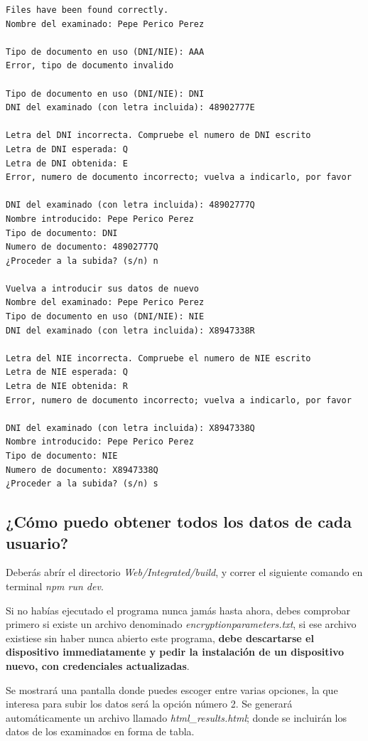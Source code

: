 \documentclass[12pt,a4paper,twoside,openright]{book}
\begin{document}
\begin{umaappendices}
\begin{verbatim}
Files have been found correctly.
Nombre del examinado: Pepe Perico Perez

Tipo de documento en uso (DNI/NIE): AAA
Error, tipo de documento invalido

Tipo de documento en uso (DNI/NIE): DNI
DNI del examinado (con letra incluida): 48902777E

Letra del DNI incorrecta. Compruebe el numero de DNI escrito
Letra de DNI esperada: Q
Letra de DNI obtenida: E
Error, numero de documento incorrecto; vuelva a indicarlo, por favor

DNI del examinado (con letra incluida): 48902777Q
Nombre introducido: Pepe Perico Perez
Tipo de documento: DNI
Numero de documento: 48902777Q
¿Proceder a la subida? (s/n) n

Vuelva a introducir sus datos de nuevo
Nombre del examinado: Pepe Perico Perez
Tipo de documento en uso (DNI/NIE): NIE
DNI del examinado (con letra incluida): X8947338R

Letra del NIE incorrecta. Compruebe el numero de NIE escrito
Letra de NIE esperada: Q
Letra de NIE obtenida: R
Error, numero de documento incorrecto; vuelva a indicarlo, por favor

DNI del examinado (con letra incluida): X8947338Q
Nombre introducido: Pepe Perico Perez
Tipo de documento: NIE
Numero de documento: X8947338Q
¿Proceder a la subida? (s/n) s
\end{verbatim}

\subsection{¿Cómo puedo obtener todos los datos de cada usuario?}

Deberás abrír el directorio \textit{Web/Integrated/build}, y correr el siguiente comando en terminal \textit{npm run dev}.

Si no habías ejecutado el programa nunca jamás hasta ahora, debes comprobar primero si existe un archivo denominado \textit{encryptionparameters.txt}, si ese archivo existiese sin haber nunca abierto este programa, \textbf{debe descartarse el dispositivo immediatamente y pedir la instalación de un dispositivo nuevo, con credenciales actualizadas}.

Se mostrará una pantalla donde puedes escoger entre varias opciones, la que interesa para subir los datos será la opción número 2. Se generará automáticamente un archivo llamado \textit{html\_results.html}; donde se incluirán los datos de los examinados en forma de tabla.


\end{umaappendices}
\end{document}

